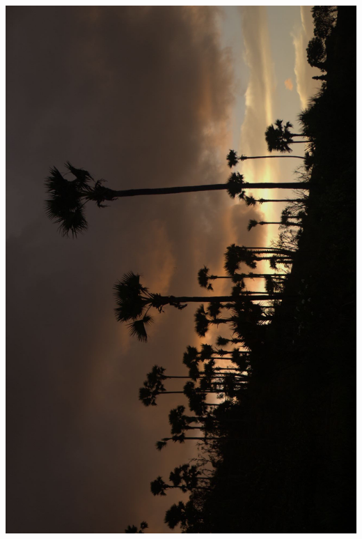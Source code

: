 \newpage\vspace*{-5cm}
\thispagestyle{empty}
\hspace*{-4cm}
\includegraphics[width=15.9cm]{articles/pagesCentrales/_MG_0882.JPG}
